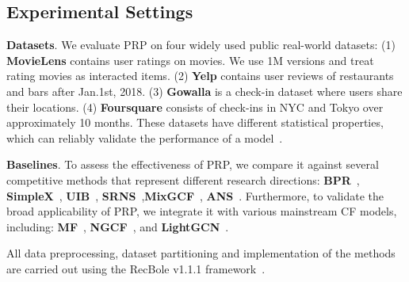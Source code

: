 \subsection{Experimental Settings}
\textbf{Datasets}. We evaluate PRP on four widely used public real-world datasets: (1) \textbf{MovieLens} contains user ratings on movies. We use 1M versions and treat rating movies as interacted items. (2) \textbf{Yelp} contains user reviews of restaurants and bars after Jan.1st, 2018. (3) \textbf{Gowalla} is a check-in dataset where users share their locations. (4) \textbf{Foursquare} consists of check-ins in NYC and Tokyo over approximately 10 months. These datasets have different statistical properties, which can reliably validate the performance of a model~\cite{CCC22}.

\textbf{Baselines}. 
To assess the effectiveness of PRP, we compare it against several competitive methods that represent different research directions: \textbf{BPR}~\cite{RFG12}, \textbf{SimpleX}~\cite{MZW21},  \textbf{UIB}~\cite{ZZY22}, \textbf{SRNS}~\cite{DQY20},\textbf{MixGCF}~\cite{HDD21}, \textbf{ANS}~\cite{ZCL23}. 
Furthermore, to validate the broad applicability of PRP, we integrate it with various mainstream CF models, including: \textbf{MF}~\cite{RFG12}, \textbf{NGCF}~\cite{WHW19}, and \textbf{LightGCN}~\cite{HDW20}.


All data preprocessing, dataset partitioning and implementation of the methods are carried out using the RecBole v1.1.1 framework~\cite{ZMH21}. 



